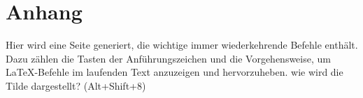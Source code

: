\chapter{Anhang}
Hier wird eine Seite generiert, die wichtige immer wiederkehrende Befehle enthält. Dazu zählen die Tasten der Anführungszeichen und die Vorgehensweise, um LaTeX-Befehle im laufenden Text anzuzeigen und hervorzuheben. wie wird die Tilde dargestellt? (Alt+Shift+8)
